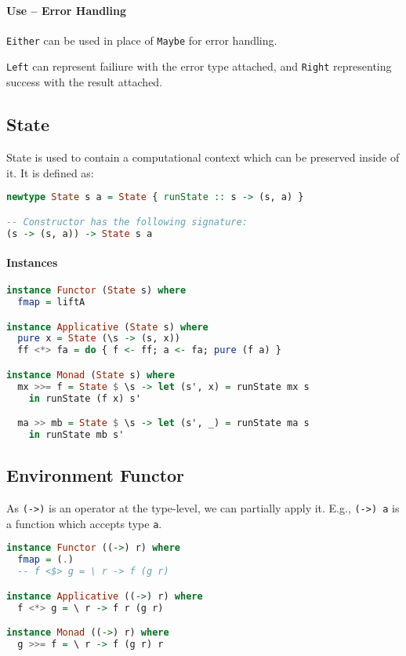 \paragraph{Use -- Error Handling}
\texttt{Either} can be used in place of \texttt{Maybe} for error handling.

\texttt{Left} can represent failiure with the error type attached, and \texttt{Right} representing success with the result attached.

\subsection{State}
State is used to contain a computational context which can be preserved inside of it. It is defined as:
\begin{lstlisting}[language=haskell]
newtype State s a = State { runState :: s -> (s, a) }

-- Constructor has the following signature:
(s -> (s, a)) -> State s a
\end{lstlisting}

\paragraph{Instances}

\begin{lstlisting}[language=haskell]
instance Functor (State s) where
  fmap = liftA

instance Applicative (State s) where
  pure x = State (\s -> (s, x))
  ff <*> fa = do { f <- ff; a <- fa; pure (f a) }

instance Monad (State s) where
  mx >>= f = State $ \s -> let (s', x) = runState mx s
    in runState (f x) s'

  ma >> mb = State $ \s -> let (s', _) = runState ma s
    in runState mb s'
\end{lstlisting}

\subsection{Environment Functor}

As \texttt{(->)} is an operator at the type-level, we can partially apply it. E.g., \texttt{(->) a} is a function which accepts type \texttt{a}.

\begin{lstlisting}[language=haskell]
instance Functor ((->) r) where
  fmap = (.)
  -- f <$> g = \ r -> f (g r)

instance Applicative ((->) r) where
  f <*> g = \ r -> f r (g r)

instance Monad ((->) r) where
  g >>= f = \ r -> f (g r) r
\end{lstlisting}